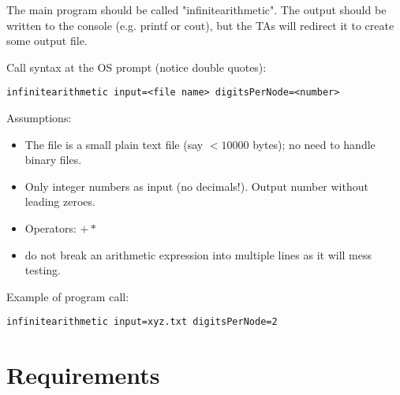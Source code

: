\documentclass[times,11pt,verbatim,js-singlespace]{article}  %
\begin{document}
The main program should be called "infinitearithmetic".
The output should be written to the console (e.g. printf or cout),
but the TAs will redirect it to create some output file.

Call syntax at the OS prompt (notice double quotes):\\
\begin{verbatim}
infinitearithmetic input=<file name> digitsPerNode=<number>
\end{verbatim}

Assumptions:
\begin{itemize}
\item The file is a small plain text file (say $< 10000$ bytes); no need to handle binary files.
\item Only integer numbers as input (no decimals!). Output number without leading zeroes.
\item Operators: $ + * $
\item 
      do not break an arithmetic expression into multiple lines as it will mess testing.
\end{itemize}


Example of program call:
\begin{verbatim}
infinitearithmetic input=xyz.txt digitsPerNode=2
\end{verbatim}



\section{Requirements}
\end{document}
